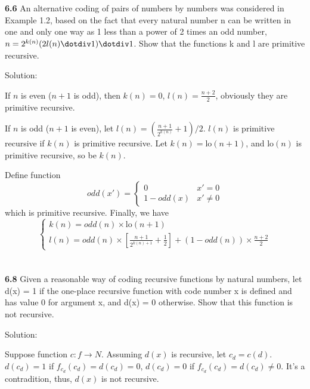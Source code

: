 \documentclass{ctexart}
\begin{document}
\section*{}

\textbf{6.6} An alternative coding of pairs of numbers by numbers was considered in
Example 1.2, based on the fact that every natural number n can be written
in one and only one way as 1 less than a power of 2 times an odd number,
$n = 2^{k(n)} (2l(n) \dotdiv 1) \dotdiv 1$. Show that the functions k and l are primitive recursive.

Solution:

If $n$ is even ($n + 1$ is odd), then $k(n) = 0$, $l(n) = \frac{n + 2}{2}$, obviously they are primitive recursive.

If $n$ is odd ($n+1$ is even), let $l(n) = (\frac{n + 1}{2^{k(n)}} + 1) / 2$. $l(n)$ is primitive recursive if $k(n)$
is primitive recursive. Let $k(n) = \mathrm{lo}(n + 1)$, and $\mathrm{lo}(n)$ is primitive recursive, so be $k(n)$.

Define function
$$
odd(x') = \begin{cases}
0 & x' = 0 \\
1 - odd(x) & x' \not= 0
\end{cases}
$$
which is primitive recursive. Finally, we have
$$
\begin{cases}
k(n) = odd(n) \times \mathrm{lo}(n + 1) \\
l(n) = odd(n) \times [\frac{n + 1}{2^{k(n)+1}} + \frac 1 2] + (1 - odd(n)) \times \frac{n + 2}{2}
\end{cases}
$$

\section*{}

\textbf{6.8} Given a reasonable way of coding recursive functions by natural numbers, let
d(x) = 1 if the one-place recursive function with code number x is defined and
has value 0 for argument x, and d(x) = 0 otherwise. Show that this function is
not recursive.

Solution:

Suppose function $c: f \to N$. Assuming $d(x)$ is recursive, let $c_d = c(d)$. $d(c_d) = 1$ if
$f_{c_d}(c_d) = d(c_d) = 0$, $d(c_d) = 0$ if $f_{c_d}(c_d) = d(c_d) \not= 0$. It's a contradition,
thus, $d(x)$ is not recursive.

\section*{}
\end{document}
